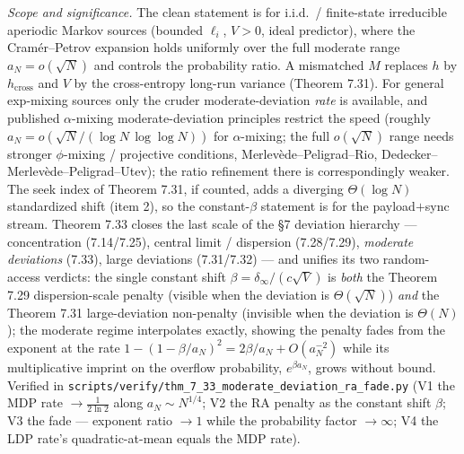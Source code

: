\documentclass[
]{article}
\begin{document}
\emph{Scope and significance.} The clean statement is for i.i.d.\ / finite-state
irreducible aperiodic Markov sources (bounded $\ell_i$, $V>0$, ideal predictor), where
the Cram\'er--Petrov expansion holds uniformly over the full moderate range
$a_N=o(\sqrt N)$ and controls the probability ratio. A mismatched $M$ replaces $h$ by
$h_{\mathrm{cross}}$ and $V$ by the cross-entropy long-run variance (Theorem 7.31). For
general exp-mixing sources only the cruder moderate-deviation \emph{rate} is available,
and published $\alpha$-mixing moderate-deviation principles restrict the speed (roughly
$a_N=o(\sqrt N/(\log N\,\log\log N))$ for $\alpha$-mixing; the full $o(\sqrt N)$ range
needs stronger $\phi$-mixing / projective conditions, Merlev\`ede--Peligrad--Rio,
Dedecker--Merlev\`ede--Peligrad--Utev); the ratio refinement there is correspondingly
weaker. The seek index of Theorem 7.31, if counted, adds a diverging $\Theta(\log N)$
standardized shift (item 2), so the constant-$\beta$ statement is for the payload$+$sync
stream. Theorem 7.33 closes the last scale of
the §7 deviation hierarchy --- concentration (7.14/7.25), central limit / dispersion
(7.28/7.29), \emph{moderate deviations} (7.33), large deviations (7.31/7.32) --- and
unifies its two random-access verdicts: the single constant shift $\beta=\delta_\infty/
(c\sqrt V)$ is \emph{both} the Theorem 7.29 dispersion-scale penalty (visible when the
deviation is $\Theta(\sqrt N)$) \emph{and} the Theorem 7.31 large-deviation
non-penalty (invisible when the deviation is $\Theta(N)$); the moderate regime
interpolates exactly, showing the penalty fades from the exponent at the rate
$1-(1-\beta/a_N)^2=2\beta/a_N+O(a_N^{-2})$ while its multiplicative imprint on the
overflow probability, $e^{\beta a_N}$, grows without bound. Verified in
\texttt{scripts/verify/thm\_7\_33\_moderate\_deviation\_ra\_fade.py} (V1 the MDP rate
$\to\tfrac1{2\ln2}$ along $a_N\sim N^{1/4}$; V2 the RA penalty as the constant shift
$\beta$; V3 the fade --- exponent ratio $\to1$ while the probability factor $\to\infty$;
V4 the LDP rate's quadratic-at-mean equals the MDP rate).
\end{document}
